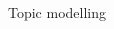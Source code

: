 \documentclass[9pt]{beamer}
\begin{document}
\begin{frame}{Topic modelling}

\begin{columns}
	\begin{column}{0.5\linewidth}
		\begin{center}
\end{center}
	\end{column}
	\begin{column}{0.5\linewidth}
		\begin{center}
		\end{center}
	\end{column}
\end{columns}

\end{frame}
\end{document}
